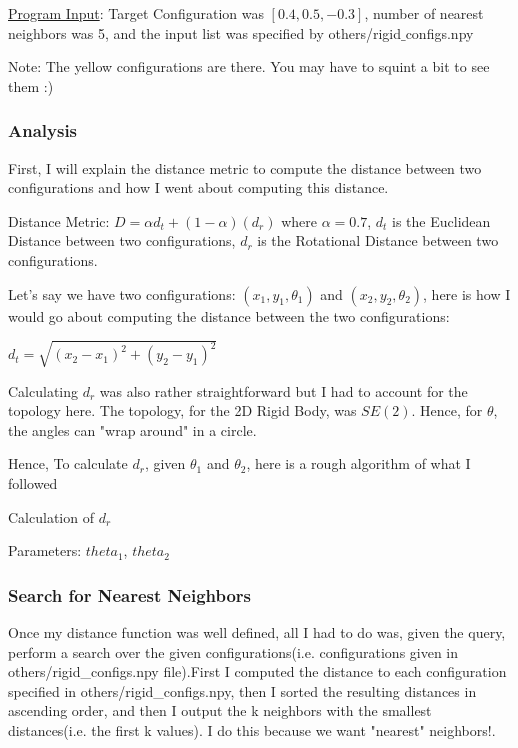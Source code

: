 \documentclass{article}
\begin{document}
\underline{Program Input}: Target Configuration was $[0.4, 0.5, -0.3]$, number of nearest neighbors was 5, and the input list was specified by others/rigid$\_$configs.npy

Note: The yellow configurations are there. You may have to squint a bit to see them :) \newline

\subsubsection{Analysis}
First, I will explain the distance metric to compute the distance between two configurations and how I went about computing this distance.  

Distance Metric: $D = \alpha d_t + (1 - \alpha) (d_r)$ \newline 
where $\alpha = 0.7$, $d_t$ is the Euclidean Distance between two configurations, $d_r$ is the Rotational Distance between two configurations. 

Let's say we have two configurations: $(x_1, y_1, \theta_1)$ and $(x_2, y_2, \theta_2)$, here is how I would go about computing the distance between the two configurations: \newline 

$d_t = \sqrt{(x_2 - x_1)^2 + (y_2 - y_1)^2}$ \newline 

Calculating $d_r$ was also rather straightforward but I had to account for the topology here. The topology, for the 2D Rigid Body, was $SE(2)$. Hence, for $\theta$, the angles can "wrap around" in a circle. 

Hence, To calculate $d_r$, given $\theta_1$ and $\theta_2$, here is a rough algorithm of what I followed


\begin{algorithm}
\caption{Calculation of $d_r$}
\begin{algorithmic}
\STATE Parameters: $theta_1$, $theta_2$


\end{algorithmic}
\end{algorithm}

\subsubsection{Search for Nearest Neighbors}
Once my distance function was well defined, all I had to do was, given the query, perform a search over the given configurations(i.e. configurations given in others/rigid\_configs.npy file).First I computed the distance to each configuration specified in others/rigid\_configs.npy,  then I sorted the resulting distances in ascending order, and then I output the k neighbors with the smallest distances(i.e. the first k values). I do this because we want "nearest" neighbors!. 
\end{document}
